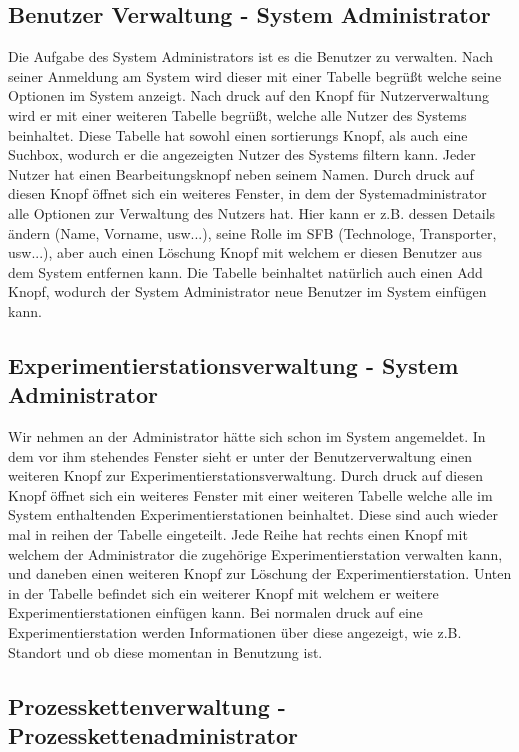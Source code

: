 \documentclass[enabledeprecatedfontcommands,fontsize=12pt,paper=a4,twoside]{scrartcl}
\begin{document}
\subsection{Benutzer Verwaltung - System Administrator}

Die Aufgabe des System Administrators ist es die Benutzer zu verwalten. Nach seiner Anmeldung am System wird dieser mit einer Tabelle begrüßt welche seine Optionen im System anzeigt. Nach druck auf den Knopf für Nutzerverwaltung wird er mit einer weiteren Tabelle begrüßt, welche alle Nutzer des Systems beinhaltet. Diese Tabelle hat sowohl einen sortierungs Knopf, als auch eine Suchbox, wodurch er die angezeigten Nutzer des Systems filtern kann.
Jeder Nutzer hat einen Bearbeitungsknopf neben seinem Namen. Durch druck auf diesen Knopf öffnet sich ein weiteres Fenster, in dem der Systemadministrator alle Optionen zur Verwaltung des Nutzers hat. Hier kann er z.B. dessen Details ändern (Name, Vorname, usw...), seine Rolle im SFB (Technologe, Transporter, usw...), aber auch einen Löschung Knopf mit welchem er diesen Benutzer aus dem System entfernen kann. 
Die Tabelle beinhaltet natürlich auch einen Add Knopf, wodurch der System Administrator neue Benutzer im System einfügen kann. 

\subsection{Experimentierstationsverwaltung - System Administrator}

Wir nehmen an der Administrator hätte sich schon im System angemeldet. In dem vor ihm stehendes Fenster sieht er unter der Benutzerverwaltung einen weiteren Knopf zur Experimentierstationsverwaltung. Durch druck auf diesen Knopf öffnet sich ein weiteres Fenster mit einer weiteren Tabelle welche alle im System enthaltenden Experimentierstationen beinhaltet.  Diese sind auch wieder mal in reihen der Tabelle eingeteilt. Jede Reihe hat rechts einen Knopf mit welchem der Administrator die zugehörige Experimentierstation verwalten kann, und daneben einen weiteren Knopf zur Löschung der Experimentierstation.
Unten in der Tabelle befindet sich ein weiterer Knopf mit welchem er weitere Experimentierstationen einfügen kann.
Bei normalen druck auf eine Experimentierstation werden Informationen über diese angezeigt, wie z.B. Standort und ob diese momentan in Benutzung ist. 
  
\subsection{Prozesskettenverwaltung - Prozesskettenadministrator}
\end{document}
